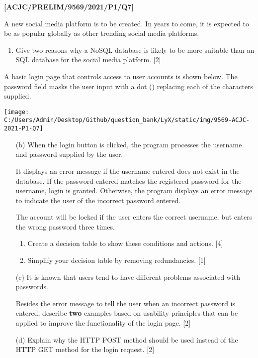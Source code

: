 \item \textbf{{[}ACJC/PRELIM/9569/2021/P1/Q7{]} }

A new social media platform is to be created. In years to come, it
is expected to be as popular globally as other trending social media
platforms.
\begin{enumerate}
\item Give two reasons why a NoSQL database is likely to be more suitable
than an SQL database for the social media platform. \hfill{}{[}2{]}
\end{enumerate}
A basic login page that controls access to user accounts is shown
below. The password field masks the user input with a dot (\textbullet )
replacing each of the characters supplied.
\noindent \begin{center}
\texttt{[image: C:/Users/Admin/Desktop/Github/question\_bank/LyX/static/img/9569-ACJC-2021-P1-Q7]}\quad{}
\par\end{center}
\begin{enumerate}
\item[(b)] When the login button is clicked, the program processes the username
and password supplied by the user.

It displays an error message if the username entered does not exist
in the database. If the password entered matches the registered password
for the username, login is granted. Otherwise, the program displays
an error message to indicate the user of the incorrect password entered.

The account will be locked if the user enters the correct username,
but enters the wrong password three times.
\begin{enumerate}
\item Create a decision table to show these conditions and actions. \hfill{}{[}4{]} 
\item Simplify your decision table by removing redundancies. \hfill{}{[}1{]} 
\end{enumerate}
\item[(c)] It is known that users tend to have different problems associated
with passwords.

Besides the error message to tell the user when an incorrect password
is entered, describe \textbf{two} examples based on usability principles
that can be applied to improve the functionality of the login page.
{[}2{]}
\item[(d)] Explain why the HTTP POST method should be used instead of the HTTP
GET method for the login request. \hfill{}{[}2{]}
\end{enumerate}